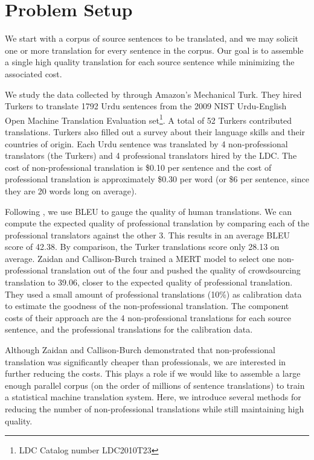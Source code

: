 \documentclass[11pt,letterpaper]{article}
\begin{document}
\section{Problem Setup}

We start with a corpus of source sentences to be translated, and we may solicit one or more translation for every sentence in the corpus.  Our goal is to assemble a single high quality translation for each source sentence while minimizing the associated cost. 

We study the data collected by  through Amazon's Mechanical Turk. 
They hired Turkers to translate 1792 Urdu sentences 
from the  2009 NIST Urdu-English Open Machine Translation Evaluation set\footnote{LDC Catalog number LDC2010T23}. A total of 52 Turkers contributed translations. Turkers also filled out a survey about their language skills and their countries of origin. Each Urdu sentence was translated by 4 non-professional translators (the Turkers) and 4 professional translators hired by the LDC. The cost of non-professional translation is  \$0.10 per sentence and the cost of professional translation is approximately \$0.30 per word (or \$6 per sentence, since they are 20 words long on average). 

Following , we use BLEU \cite{papineni2002bleu} to gauge the quality of human translations.  We can compute the expected quality of professional translation by comparing each of the professional translators against the other 3.  This results in an average BLEU score of  42.38.  By comparison, the Turker translations score only 28.13 on average. Zaidan and Callison-Burch trained a MERT \cite{och2003minimum} \cite{Zaidan09zmert} model to select one non-professional translation out of the four and pushed the quality of crowdsourcing translation to 39.06, closer to the expected quality of professional translation. They used a small amount of professional translations (10\%) as calibration data to estimate the goodness of the non-professional translation. The component costs of their approach are the 4 non-professional translations for each source sentence, and the professional translations for the calibration data.

Although Zaidan and Callison-Burch demonstrated that non-professional translation was significantly cheaper than professionals, we are interested in further reducing the costs.  This plays a role if we would like to assemble a large enough parallel corpus (on the order of millions of sentence translations) to train a statistical machine translation system. 
Here, we introduce several methods for reducing the number of non-professional translations  while still maintaining high quality. 
\end{document}
